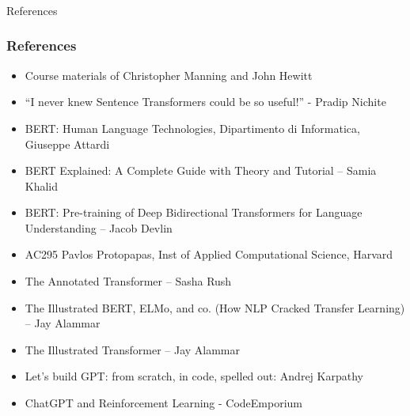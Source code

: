 \begin{frame}[fragile]\frametitle{}
\begin{center}
{\Large References}
\end{center}
\end{frame}

\begin{frame}[fragile]\frametitle{References}
		\begin{itemize}
		\item Course materials of Christopher Manning and John Hewitt
		\item ``I never knew Sentence Transformers could be so useful!'' - Pradip Nichite
		\item BERT: Human Language Technologies, Dipartimento di Informatica, Giuseppe Attardi
		\item BERT Explained: A Complete Guide with Theory and Tutorial – Samia Khalid
		\item BERT: Pre-training of Deep Bidirectional Transformers for Language Understanding – Jacob Devlin
		\item AC295 Pavlos Protopapas, Inst of Applied Computational Science, Harvard
		\item The Annotated Transformer – Sasha Rush
		\item The Illustrated BERT, ELMo, and co. (How NLP Cracked Transfer Learning) – Jay Alammar
		\item The Illustrated Transformer – Jay Alammar
		\item Let's build GPT: from scratch, in code, spelled out: Andrej Karpathy
		\item ChatGPT and Reinforcement Learning - CodeEmporium
		\end{itemize}
\end{frame}



